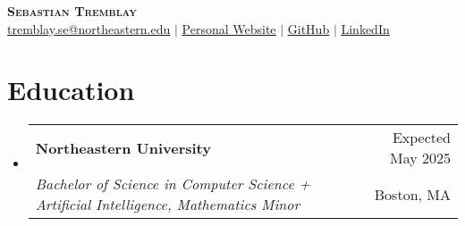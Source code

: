 \documentclass[letterpaper,11pt]{article}
\makeatletter
\newcommand{\resumeSubheading}[4]{
  \vspace{-2pt}\item
    \begin{tabular*}{1.00\textwidth}[t]{l@{\extracolsep{\fill}}r}
      \textbf{\small#1} & \small{#2} \\
      \textit{\small#3} & \small{#4} \\
    \end{tabular*}\vspace{-7pt}
}
\newcommand{\resumeSubHeadingListStart}{\begin{itemize}[leftmargin=0in, label={}]\vspace{-3pt}}
\newcommand{\resumeSubHeadingListEnd}{\end{itemize}}
\makeatother
\begin{document}

\begin{center}
    \textbf{\Huge \scshape Sebastian Tremblay} 
    \\ \vspace{1pt}
    \small
    \href{mailto:tremblay.se@northeastern.edu}{\uline{tremblay.se@northeastern.edu}} $|$
    \href{https://www.sebytremblay.com}{\uline{Personal Website}} $|$
    \href{https://github.com/sebytremblay}{\uline{GitHub}} $|$
    \href{https://www.linkedin.com/in/sebastiantremblay/}{\uline{LinkedIn}}
\end{center}

\section{Education}
  \resumeSubHeadingListStart
    \resumeSubheading
      {Northeastern University}{Expected May 2025}
      {Bachelor of Science in Computer Science + Artificial Intelligence, Mathematics Minor}{Boston, MA}
    \vspace{-8pt}
  \resumeSubHeadingListEnd
\end{document}
